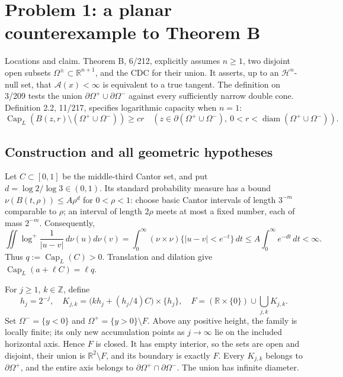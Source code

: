 \documentclass[10pt]{article}
\begin{document}
\section*{Problem 1: a planar counterexample to Theorem B}
Locations and claim. Theorem B, 6/212, explicitly assumes \(n\ge1\), two disjoint open subsets \(\Omega^\pm\subset\mathbb R^{n+1}\), and the CDC for their union. It asserts, up to an \(\mathcal H^n\)-null set, that \(\mathcal A(x)<\infty\) is equivalent to a true tangent. The definition on 3/209 tests the union \(\partial\Omega^+\cup\partial\Omega^-\) against every sufficiently narrow double cone. Definition 2.2, 11/217, specifies logarithmic capacity when \(n=1\): \[\operatorname{Cap}_L(B(z,r)\setminus(\Omega^+\cup\Omega^-))\ge c r
 \quad(z\in\partial(\Omega^+\cup\Omega^-),\ 0<r<\operatorname{diam}(\Omega^+\cup\Omega^-)).\]\par
\subsection*{Construction and all geometric hypotheses}
Let \(C\subset[0,1]\) be the middle-third Cantor set, and put \(d=\log2/\log3\in(0,1)\). Its standard probability measure has a bound \(\nu(B(t,\rho))\le A\rho^d\) for \(0<\rho<1\): choose basic Cantor intervals of length \(3^{-m}\) comparable to \(\rho\); an interval of length \(2\rho\) meets at most a fixed number, each of mass \(2^{-m}\). Consequently, \[\iint\log^+\frac1{|u-v|}\,d\nu(u)d\nu(v)
 =\int_0^\infty(\nu\times\nu)\{|u-v|<e^{-t}\}\,dt
 \le A\int_0^\infty e^{-dt}\,dt<\infty .\] Thus \(q:=\operatorname{Cap}_L(C)>0\). Translation and dilation give \(\operatorname{Cap}_L(a+\ell C)=\ell q\).\par
For \(j\ge1\), \(k\in\mathbb Z\), define \[h_j=2^{-j},\quad
 K_{j,k}=\bigl(kh_j+(h_j/4)C\bigr)\times\{h_j\},\quad
 F=(\mathbb R\times\{0\})\cup\bigcup_{j,k}K_{j,k}.\] Set \(\Omega^-=\{y<0\}\) and \(\Omega^+=\{y>0\}\setminus F\). Above any positive height, the family is locally finite; its only new accumulation points as \(j\to\infty\) lie on the included horizontal axis. Hence \(F\) is closed. It has empty interior, so the sets are open and disjoint, their union is \(\mathbb R^2\setminus F\), and its boundary is exactly \(F\). Every \(K_{j,k}\) belongs to \(\partial\Omega^+\), and the entire axis belongs to \(\partial\Omega^+\cap\partial\Omega^-\). The union has infinite diameter.\par
\end{document}
